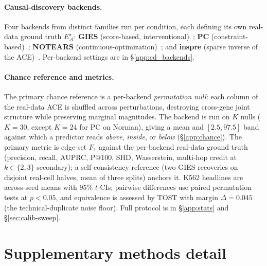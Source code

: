 \documentclass{article}
\theoremstyle{plain}
\theoremstyle{definition}
\theoremstyle{remark}
\begin{document}
\paragraph{Causal-discovery backends.}
Four backends from distinct families run per condition, each defining its own real-data ground truth $E^{\star}_{\mathcal{A}}$: \textbf{GIES} (score-based, interventional)~\citep{hauser2012gies}; \textbf{PC} (constraint-based)~\citep{spirtes2000}; \textbf{NOTEARS} (continuous-optimization)~\citep{zheng2018notears}; and \textbf{inspre} (sparse inverse of the ACE)~\citep{brown2025inspre}. Per-backend settings are in \S\ref{app:cd_backends}.

\paragraph{Chance reference and metrics.}
The primary chance reference is a per-backend \emph{permutation null}: each column of the real-data ACE is shuffled across perturbations, destroying cross-gene joint structure while preserving marginal magnitudes. The backend is run on $K$ nulls ($K=30$, except $K=24$ for PC on Norman), giving a mean and $[2.5,97.5]$ band against which a predictor reads \emph{above}, \emph{inside}, or \emph{below} (\S\ref{app:chance}). The primary metric is edge-set $F_1$ against the per-backend real-data ground truth (precision, recall, AUPRC, P@100, SHD, Wasserstein, multi-hop credit at $k\in\{2,3\}$ secondary); a self-consistency reference (two GIES recoveries on disjoint real-cell halves, mean of three splits) anchors it. K562 headlines are across-seed means with 95\% $t$-CIs; pairwise differences use paired permutation tests at $p<0.05$, and equivalence is assessed by TOST with margin $\Delta=0.045$ (the technical-duplicate noise floor). Full protocol is in \S\ref{app:stats} and \S\ref{sec:calib-sweep}.

\section{Supplementary methods detail}
\end{document}

